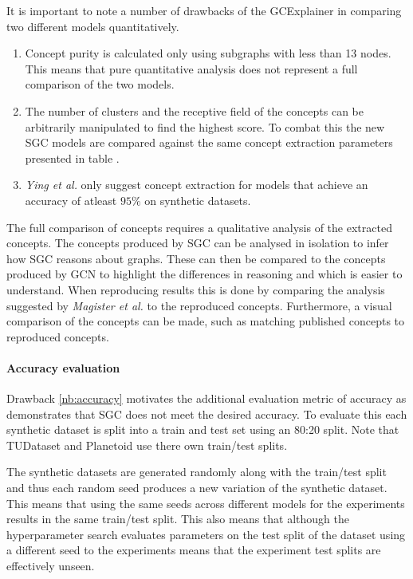 It is important to note a number of drawbacks of the GCExplainer in comparing two different models quantitatively.
\begin{enumerate}
    \item 
        Concept purity is calculated only using subgraphs with less than 13 nodes.
        This means that pure quantitative analysis does not represent a full comparison of the two models.
    \item 
        The number of clusters and the receptive field of the concepts can be arbitrarily manipulated to find the highest score.
        To combat this the new SGC models are compared against the same concept extraction parameters presented in table .
    \item 
        \label{nb:accuracy}
        \textit{Ying et al.}\cite{ying2019gnnexplainer} only suggest concept extraction for models that achieve an accuracy of atleast $95\%$ on synthetic datasets. 
\end{enumerate}

The full comparison of concepts requires a qualitative analysis of the extracted concepts.
The concepts produced by SGC can be analysed in isolation to infer how SGC reasons about graphs.
These can then be compared to the concepts produced by GCN to highlight the differences in reasoning and which is easier to understand.
When reproducing results this is done by comparing the analysis suggested by \textit{Magister et al.}\cite{magister2021gcexplainer} to the reproduced concepts.
Furthermore, a visual comparison of the concepts can be made, such as matching published concepts to reproduced concepts.

\paragraph{Accuracy evaluation}
Drawback \ref{nb:accuracy} motivates the additional evaluation metric of accuracy as  demonstrates that SGC does not meet the desired accuracy.
To evaluate this each synthetic dataset is split into a train and test set using an 80:20 split.
Note that TUDataset and Planetoid\cite{kipf2016semi} use there own train/test splits.

The synthetic datasets are generated randomly along with the train/test split and thus each random seed produces a new variation of the synthetic dataset.
This means that using the same seeds across different models for the experiments results in the same train/test split.
This also means that although the hyperparameter search evaluates parameters on the test split of the dataset using a different seed to the experiments means that the experiment test splits are effectively unseen.

